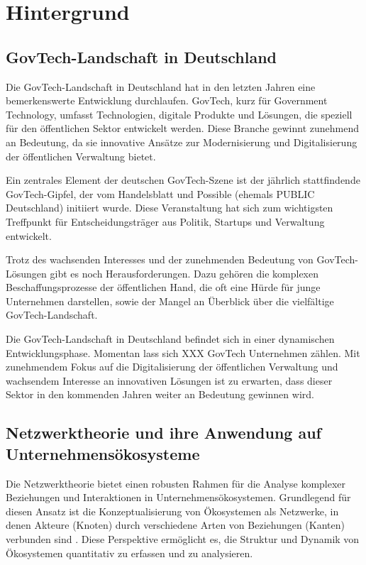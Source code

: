 \documentclass[a4paper,11pt]{article}
\begin{document}
\section{Hintergrund}
\subsection{GovTech-Landschaft in Deutschland}
Die GovTech-Landschaft in Deutschland hat in den letzten Jahren eine bemerkenswerte Entwicklung durchlaufen. GovTech, kurz für Government Technology, umfasst Technologien, digitale Produkte und Lösungen, die speziell für den öffentlichen Sektor entwickelt werden. Diese Branche gewinnt zunehmend an Bedeutung, da sie innovative Ansätze zur Modernisierung und Digitalisierung der öffentlichen Verwaltung bietet.

Ein zentrales Element der deutschen GovTech-Szene ist der jährlich stattfindende GovTech-Gipfel, der vom Handelsblatt und Possible (ehemals PUBLIC Deutschland) initiiert wurde. Diese Veranstaltung hat sich zum wichtigsten Treffpunkt für Entscheidungsträger aus Politik, Startups und Verwaltung entwickelt. 

Trotz des wachsenden Interesses und der zunehmenden Bedeutung von GovTech-Lösungen gibt es noch Herausforderungen. Dazu gehören die komplexen Beschaffungsprozesse der öffentlichen Hand, die oft eine Hürde für junge Unternehmen darstellen, sowie der Mangel an Überblick über die vielfältige GovTech-Landschaft.

Die GovTech-Landschaft in Deutschland befindet sich in einer dynamischen Entwicklungsphase. Momentan lass sich XXX GovTech Unternehmen zählen. Mit zunehmendem Fokus auf die Digitalisierung der öffentlichen Verwaltung und wachsendem Interesse an innovativen Lösungen ist zu erwarten, dass dieser Sektor in den kommenden Jahren weiter an Bedeutung gewinnen wird.
\subsection{Netzwerktheorie und ihre Anwendung auf Unternehmensökosysteme}
Die Netzwerktheorie bietet einen robusten Rahmen für die Analyse komplexer Beziehungen und Interaktionen in Unternehmensökosystemen. Grundlegend für diesen Ansatz ist die Konzeptualisierung von Ökosystemen als Netzwerke, in denen Akteure (Knoten) durch verschiedene Arten von Beziehungen (Kanten) verbunden sind \parencite{Battistella2013}. Diese Perspektive ermöglicht es, die Struktur und Dynamik von Ökosystemen quantitativ zu erfassen und zu analysieren.
\end{document}

